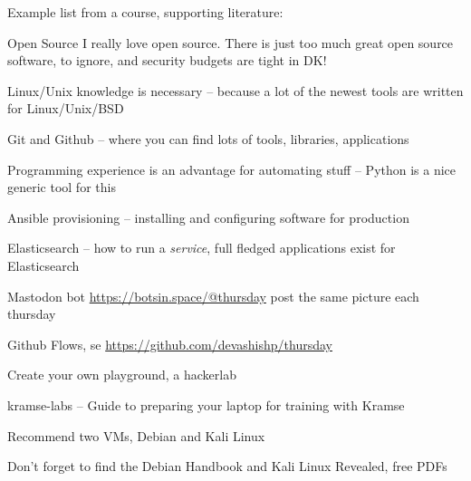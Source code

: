 \documentclass[Screen16to9,17pt]{foils}
\begin{document}
Example list from a course, supporting literature:\\





\begin{quote}

\end{quote}

\begin{list2}
\item Open Source I really love open source. There is just too much great open source software, to ignore, and security budgets are tight in DK!
\item Linux/Unix knowledge is necessary
-- because a lot of the newest tools are written for Linux/Unix/BSD
\item Git and Github -- where you can find lots of tools, libraries, applications
\item Programming experience is an advantage for automating stuff -- Python is a nice generic tool for this
\item Ansible provisioning -- installing and configuring software for production
\item Elasticsearch -- how to run a \emph{service}, full fledged applications exist for Elasticsearch
\end{list2}



\begin{quote}

\end{quote}

\begin{list2}
\item Mastodon bot \url{https://botsin.space/@thursday} post the same picture each thursday
\item Github Flows, se \url{https://github.com/devashishp/thursday}

\end{list2}



\begin{list2}
\item Create your own playground, a hackerlab
\item kramse-labs -- Guide to preparing your laptop for training with Kramse\\
\item Recommend two VMs, Debian and Kali Linux
\item Don't forget to find the Debian Handbook and Kali Linux Revealed, free PDFs
\end{list2}
\end{document}
